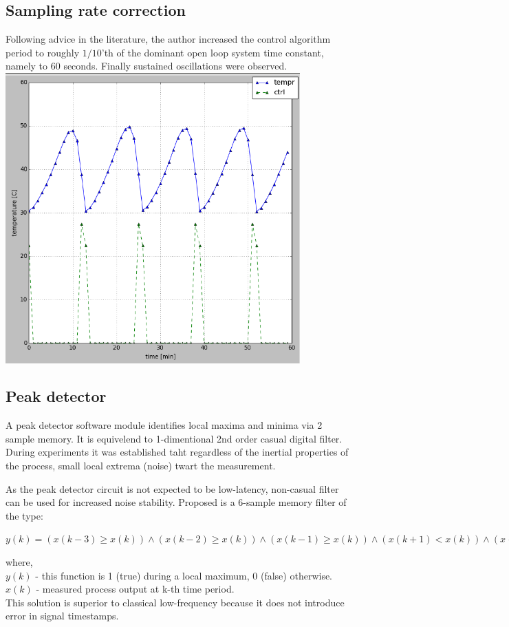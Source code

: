 \subsection{Sampling rate correction}
Following advice in the literature, the author increased the control algorithm period to roughly $1/10$'th of the dominant open loop system time constant, namely to 60 seconds.
Finally sustained oscillations were observed.
\\
\includegraphics[width=0.85\textwidth]{../images/exp_relay_slow}~

\subsection{Peak detector}
A peak detector software module identifies local maxima and minima via 2 sample memory.
It is equivelend to 1-dimentional 2nd order casual digital filter.
During experiments it was established taht regardless of the inertial properties of the process, small local extrema (noise) twart the measurement.
\par
As the peak detector circuit is not expected to be low-latency, non-casual filter can be used for increased noise stability.
Proposed is a 6-sample memory filter of the type:

\par $
    y(k) = (x(k-3) \geq x(k)) \land (x(k-2) \geq x(k)) \land (x(k-1) \geq x(k)) \land
           (x(k+1) < x(k)) \land (x(k+2) < x(k)) \land (x(k+3) < x(k))
$ \par
where, \\
$y(k)$ - this function is 1 (true) during a local maximum, 0 (false) otherwise. \\
$x(k)$ - measured process output at k-th time period.
\\
This solution is superior to classical low-frequency because it does not introduce error in signal timestamps.
